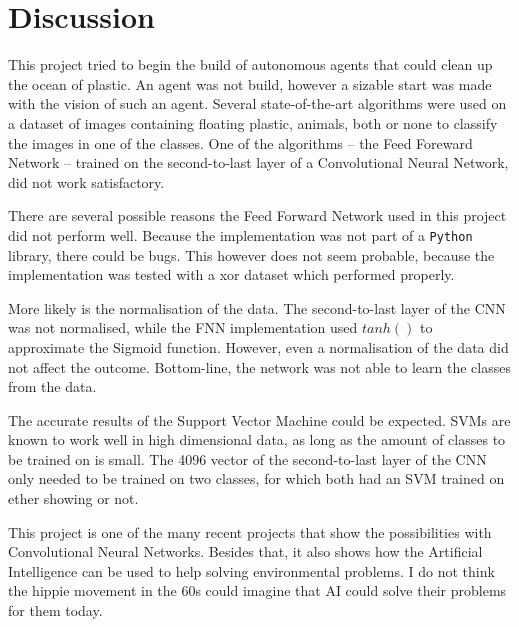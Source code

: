 \section{Discussion}
\label{sec:Discussion}
This project tried to begin the build of autonomous agents that could clean up the ocean of plastic.
An agent was not build, however a sizable start was made with the vision of such an agent.
Several state-of-the-art algorithms were used on a dataset of images containing floating plastic, animals, both or none to classify the images in one of the classes.
One of the algorithms -- the Feed Foreward Network -- trained on the second-to-last layer of a Convolutional Neural Network, did not work satisfactory.

There are several possible reasons the Feed Forward Network used in this project did not perform well.
Because the implementation was not part of a \texttt{Python} library, there could be bugs.
This however does not seem probable, because the implementation was tested with a xor dataset which performed properly.

More likely is the normalisation of the data.
The second-to-last layer of the CNN was not normalised, while the FNN implementation used ${tanh}()$ to approximate the Sigmoid function.
However, even a normalisation of the data did not affect the outcome.
Bottom-line, the network was not able to learn the classes from the data.

The accurate results of the Support Vector Machine could be expected.
SVMs are known to work well in high dimensional data, as long as the amount of classes to be trained on is small.
The 4096 vector of the second-to-last layer of the CNN only needed to be trained on two classes, for which both had an SVM trained on ether showing or not.





This project is one of the many recent projects that show the possibilities with Convolutional Neural Networks.
Besides that, it also shows how the Artificial Intelligence can be used to help solving environmental problems.
I do not think the hippie movement in the 60s could imagine that AI could solve their problems for them today.


